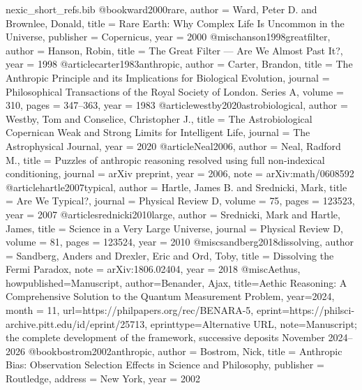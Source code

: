 \begin{filecontents}[overwrite]{nexic_short_refs.bib}
@book{ward2000rare,
  author = {Ward, Peter D. and Brownlee, Donald},
  title = {Rare Earth: Why Complex Life Is Uncommon in the Universe},
  publisher = {Copernicus},
  year = {2000}
}
@misc{hanson1998greatfilter,
  author = {Hanson, Robin},
  title = {The Great Filter --- Are We Almost Past It?},
  year = {1998}
}
@article{carter1983anthropic,
  author = {Carter, Brandon},
  title = {The Anthropic Principle and its Implications for Biological Evolution},
  journal = {Philosophical Transactions of the Royal Society of London. Series A},
  volume = {310}, pages = {347--363}, year = {1983}
}
@article{westby2020astrobiological,
  author = {Westby, Tom and Conselice, Christopher J.},
  title = {The Astrobiological Copernican Weak and Strong Limits for Intelligent Life},
  journal = {The Astrophysical Journal}, year = {2020}
}
@article{Neal2006,
  author = {Neal, Radford M.},
  title = {Puzzles of anthropic reasoning resolved using full non-indexical conditioning},
  journal = {arXiv preprint}, year = {2006}, note = {arXiv:math/0608592}
}
@article{hartle2007typical,
  author = {Hartle, James B. and Srednicki, Mark},
  title = {Are We Typical?},
  journal = {Physical Review D}, volume = {75}, pages = {123523}, year = {2007}
}
@article{srednicki2010large,
  author = {Srednicki, Mark and Hartle, James},
  title = {Science in a Very Large Universe},
  journal = {Physical Review D}, volume = {81}, pages = {123524}, year = {2010}
}
@misc{sandberg2018dissolving,
  author = {Sandberg, Anders and Drexler, Eric and Ord, Toby},
  title = {Dissolving the Fermi Paradox},
  note = {arXiv:1806.02404}, year = {2018}
}
@misc{Aethus, howpublished={Manuscript}, author={Benander, Ajax}, title={Aethic Reasoning: A Comprehensive Solution to the Quantum Measurement Problem}, year={2024}, month = {11}, url={https://philpapers.org/rec/BENARA-5}, eprint={https://philsci-archive.pitt.edu/id/eprint/25713}, eprinttype={Alternative URL}, note={Manuscript; the complete development of the framework, successive deposits November 2024--2026}}
@book{bostrom2002anthropic, author = {Bostrom, Nick}, title = {Anthropic Bias: Observation Selection Effects in Science and Philosophy}, publisher = {Routledge}, address = {New York}, year = {2002}}

\end{filecontents}
